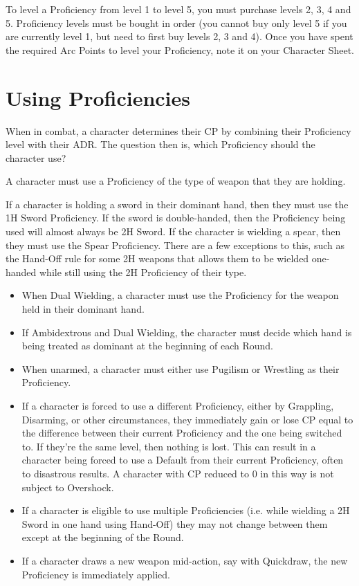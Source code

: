 \documentclass[oneside,11pt,english]{book}
\begin{document}
To level a Proficiency from level 1 to level 5, you must purchase levels 2, 3, 4
and 5. Proficiency levels must be bought in order (you cannot buy only level 5
if you are currently level 1, but need to first buy levels 2, 3 and 4). Once you
have spent the required Arc Points to level your Proficiency, note it on your
Character Sheet.  

\section{Using Proficiencies}
When in combat, a character determines their CP by combining their Proficiency level with their ADR. 
The question then is, which Proficiency should the character use? 

A character must use a Proficiency of the type of weapon that they are holding.  

If a character is holding a sword in their dominant hand, then they must use the 1H Sword Proficiency. If 
the sword is double-handed, then the Proficiency being used will almost always be 2H Sword. If the 
character is wielding a spear, then they must use the Spear Proficiency. There are a few exceptions to this, 
such as the Hand-Off rule for some 2H weapons that allows them to be wielded one-handed while still 
using the 2H Proficiency of their type. 
\begin{itemize}
\item When Dual Wielding, a character must use the Proficiency for the weapon held in their dominant hand. 
\item If Ambidextrous and Dual Wielding, the character must decide which hand is being treated as dominant at the beginning of each Round.
\item When unarmed, a character must either use Pugilism or Wrestling as their Proficiency. 
\item If a character is forced to use a different Proficiency, either by
  Grappling, Disarming, or other circumstances, they immediately gain or lose CP
  equal to the difference between their current Proficiency and the one being
  switched to. If they’re the same level, then nothing is lost. This can result
  in a character being forced to use a Default from their current Proficiency,
  often to disastrous results. A character with CP reduced to 0 in this way is
  not subject to Overshock. 
\item If a character is eligible to use multiple Proficiencies (i.e. while
  wielding a 2H Sword in one hand using Hand-Off) they may not change between
  them except at the beginning of the Round. 
\item If a character draws a new weapon mid-action, say with Quickdraw, the new Proficiency is immediately applied.
\end{itemize}
\end{document}
